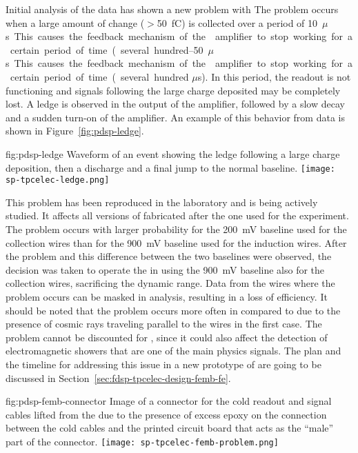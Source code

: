 Initial analysis of the  data has shown a new problem 
with  The problem occurs when a large amount of 
change ($>$\SI{50}{fC}) is collected over a period of \SIrange{10}{50}{$\mu$s}.
This causes the feedback mechanism of the  amplifier 
to stop working for a certain period of time (several hundred $\mu$s). 
In this period, the readout is not functioning and signals following 
the large charge deposited may be completely lost. A ledge is observed 
in the output of the  amplifier, followed by a slow decay 
and a sudden turn-on of the amplifier. An example of this behavior 
from data is shown in Figure~\ref{fig:pdsp-ledge}.

\begin{dunefigure}
{fig:pdsp-ledge}
{Waveform of an event showing the ledge following a large charge 
deposition, then a discharge and a final jump to the normal baseline.}
\texttt{[image: sp-tpcelec-ledge.png]}
\end{dunefigure}

This problem has been reproduced in the laboratory and is being actively 
studied. It affects all versions of  fabricated after 
the one used for the  experiment. The problem occurs 
with larger probability for the \SI{200}{mV} baseline used for the collection
wires than for the \SI{900}{mV} baseline used for the induction wires.
After the problem and this difference between the two baselines were 
observed, the decision was taken to operate the  in  
using the \SI{900}{mV} baseline also for the collection wires, sacrificing
the dynamic range. Data from the wires where the problem occurs can
be masked in analysis, resulting in a loss of efficiency. It should be
noted that the problem occurs more often in  compared to
 due to the presence of cosmic rays traveling parallel
to the  wires in the first case. The problem cannot be 
discounted for , since it could also affect the detection
of electromagnetic showers that are one of the main physics signals.
The plan and the timeline for addressing this issue in a new prototype
of  are going to be discussed in 
Section~\ref{sec:fdsp-tpcelec-design-femb-fe}.

\begin{dunefigure}
{fig:pdsp-femb-connector}
{Image of a connector for the cold readout and signal cables lifted from
the  due to the presence of excess epoxy on the 
connection between the cold cables and the printed circuit board
that acts as the ``male'' part of the connector.}
\texttt{[image: sp-tpcelec-femb-problem.png]}
\end{dunefigure}

